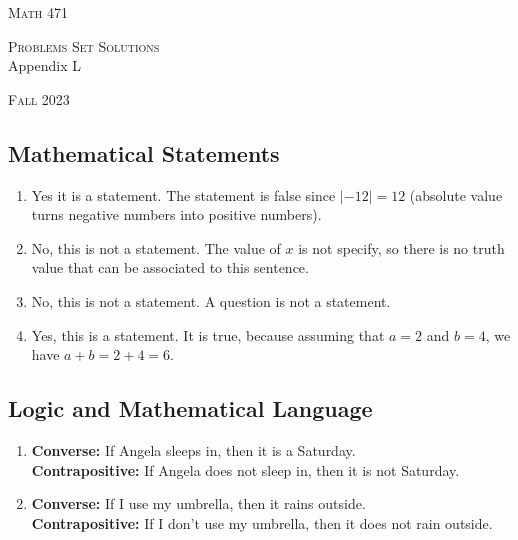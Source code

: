


\hrulefill

\begin{minipage}{0.33\textwidth}
\textsc{Math 471}
\end{minipage} \hfill 
\begin{minipage}{0.32\textwidth}
\centering
\textsc{Problems Set Solutions} \\
Appendix L
\end{minipage}
 \hfill 
 \begin{minipage}{0.33\textwidth}
 \flushright \textsc{Fall 2023}
 \end{minipage}

\hrulefill

\setcounter{section}{12}

 \subsection[~~Mathematical Statements]{Mathematical Statements}

 \begin{problem}
\begin{enumerate}[label=\alph*)]
\item Yes it is a statement. The statement is false since $|-12| = 12$ (absolute value turns negative numbers into positive numbers).
\item No, this is not a statement. The value of $x$ is not specify, so there is no truth value that can be associated to this sentence.
\item No, this is not a statement. A question is not a statement.
\item Yes, this is a statement. It is true, because assuming that $a = 2$ and $b = 4$, we have $a + b = 2 + 4 = 6$.
\end{enumerate}
 \end{problem}

 \subsection[~~Logic and Mathematical Language]{Logic and Mathematical Language}

 \begin{problem}
 \begin{enumerate}[label=\alph*)]
 \item \textbf{Converse:} If Angela sleeps in, then it is a Saturday. \\
 \textbf{Contrapositive:} If Angela does not sleep in, then it is not Saturday.
 \item \textbf{Converse:} If I use my umbrella, then it rains outside. \\
 \textbf{Contrapositive:} If I don't use my umbrella, then it does not rain outside.
 \end{enumerate}
 \end{problem}

